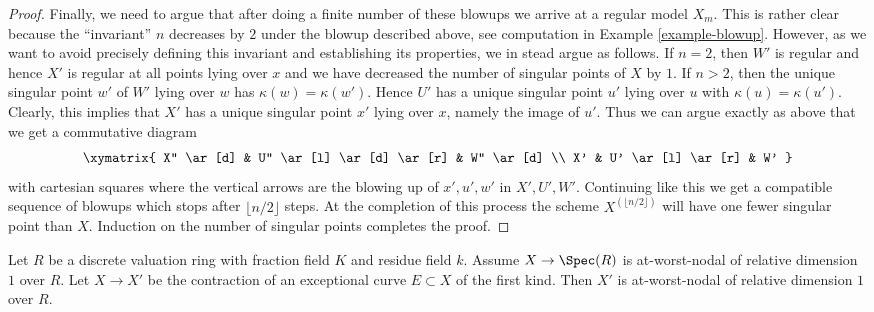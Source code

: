\begin{proof}
\medskip\noindent
Finally, we need to argue that after doing a finite number
of these blowups we arrive at a regular model $X_m$.
This is rather clear because the ``invariant'' $n$ decreases by $2$
under the blowup described above, see computation in
Example \ref{example-blowup}.
However, as we want to avoid precisely defining this invariant
and establishing its properties, we in stead argue as follows.
If $n = 2$, then $W'$ is regular and hence $X'$
is regular at all points lying over $x$ and we have
decreased the number of singular points of $X$ by $1$.
If $n > 2$, then the unique singular point $w'$ of $W'$ lying over $w$
has $\kappa(w) = \kappa(w')$. Hence $U'$ has a unique
singular point $u'$ lying over $u$ with $\kappa(u) = \kappa(u')$.
Clearly, this implies that $X'$ has a unique singular point $x'$
lying over $x$, namely the image of $u'$. Thus we can
argue exactly as above that we get a commutative diagram
$$
\xymatrix{
X'' \ar[d] &
U'' \ar[l] \ar[d] \ar[r] &
W'' \ar[d] \\
X' & U' \ar[l] \ar[r] & W'
}
$$
with cartesian squares where the vertical arrows are the blowing
up of $x', u', w'$ in $X', U', W'$. Continuing like this we get
a compatible sequence of blowups which stops after
$\lfloor n/2 \rfloor$ steps. At the completion of this process
the scheme $X^{(\lfloor n/2 \rfloor)}$ will have one fewer
singular point than $X$. Induction on the number of singular
points completes the proof.
\end{proof}

\begin{lemma}
\label{lemma-blowdown-at-worst-nodal}
Let $R$ be a discrete valuation ring with fraction field $K$
and residue field $k$. Assume $X \to \Spec(R)$ is
at-worst-nodal of relative dimension $1$ over $R$.
Let $X \to X'$ be the contraction of an
exceptional curve $E \subset X$ of the first kind.
Then $X'$ is at-worst-nodal of relative dimension $1$ over $R$.
\end{lemma}

